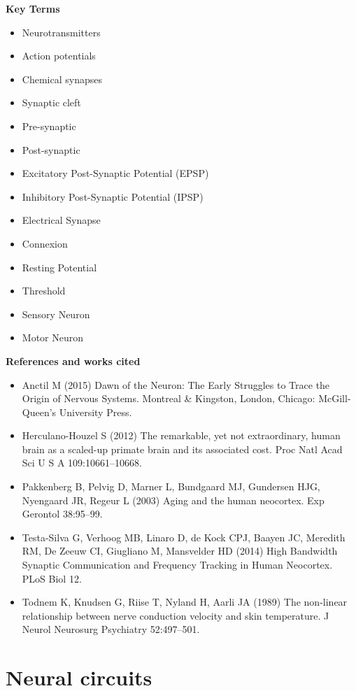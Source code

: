 \documentclass[
]{book}
\begin{document}
\textbf{Key Terms}

\begin{itemize}
\item
  Neurotransmitters
\item
  Action potentials
\item
  Chemical synapses
\item
  Synaptic cleft
\item
  Pre-synaptic
\item
  Post-synaptic
\item
  Excitatory Post-Synaptic Potential (EPSP)
\item
  Inhibitory Post-Synaptic Potential (IPSP)
\item
  Electrical Synapse
\item
  Connexion
\item
  Resting Potential
\item
  Threshold
\item
  Sensory Neuron
\item
  Motor Neuron
\end{itemize}

\textbf{References and works cited}

\begin{itemize}
\item
  Anctil M (2015) Dawn of the Neuron: The Early Struggles to Trace the Origin of Nervous Systems. Montreal \& Kingston, London, Chicago: McGill-Queen's University Press.
\item
  Herculano-Houzel S (2012) The remarkable, yet not extraordinary, human brain as a scaled-up primate brain and its associated cost. Proc Natl Acad Sci U S A 109:10661--10668.
\item
  Pakkenberg B, Pelvig D, Marner L, Bundgaard MJ, Gundersen HJG, Nyengaard JR, Regeur L (2003) Aging and the human neocortex. Exp Gerontol 38:95--99.
\item
  Testa-Silva G, Verhoog MB, Linaro D, de Kock CPJ, Baayen JC, Meredith RM, De Zeeuw CI, Giugliano M, Mansvelder HD (2014) High Bandwidth Synaptic Communication and Frequency Tracking in Human Neocortex. PLoS Biol 12.
\item
  Todnem K, Knudsen G, Riise T, Nyland H, Aarli JA (1989) The non-linear relationship between nerve conduction velocity and skin temperature. J Neurol Neurosurg Psychiatry 52:497--501.
\end{itemize}

\hypertarget{neurophysiology-circuits}{%
\section{Neural circuits}\label{neurophysiology-circuits}}
\end{document}

